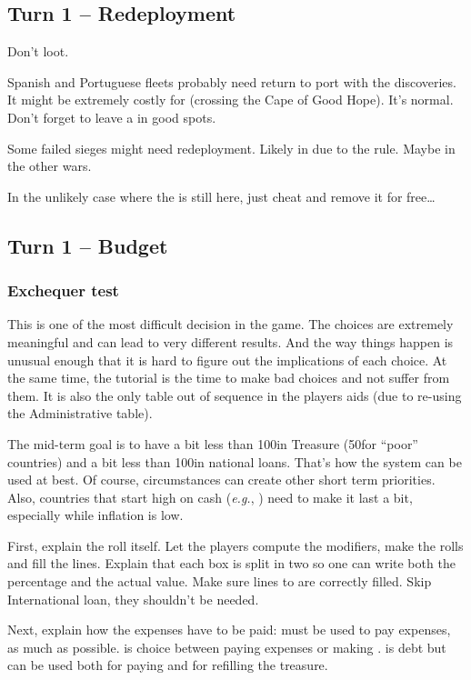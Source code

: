 \subsection{Turn 1 -- Redeployment}
\aparag Don't loot.

\aparag Spanish and Portuguese fleets probably need return to port with the
discoveries. It might be extremely costly for \POR (crossing the Cape of Good
Hope). It's normal. Don't forget to leave a \LeaderC in good spots.

\aparag Some failed sieges might need redeployment. Likely in \villeRagusa due
to the \regionBalkans rule. Maybe in the other wars.

\aparag In the unlikely case where the \REVOLT is still here, just cheat and
remove it for free\ldots

\subsection{Turn 1 -- Budget}
\subsubsection{Exchequer test}
\aparag This is one of the most difficult decision in the game. The choices
are extremely meaningful and can lead to very different results. And the way
things happen is unusual enough that it is hard to figure out the implications
of each choice.
\bparag At the same time, the tutorial is the time to make bad choices and not
suffer from them.
\bparag It is also the only table out of sequence in the players aids (due to
re-using the Administrative table).

\aparag The mid-term goal is to have a bit less than 100\ducats in Treasure
(50\ducats for ``poor'' countries) and a bit less than 100\ducats in national
loans. That's how the system can be used at best.
\bparag Of course, circumstances can create other short term priorities.
\bparag Also, countries that start high on cash (\emph{e.g.}, \POR) need to
make it last a bit, especially while inflation is low.

\aparag First, explain the roll itself. Let the players compute the modifiers,
make the rolls and fill the lines.
\bparag Explain that each box is split in two so one can write both the
percentage and the actual value. Make sure lines 
to  are correctly filled.
\bparag Skip International loan, they shouldn't be needed.

\aparag Next, explain how the expenses have to be paid:
\bparag {} must be used to pay expenses, as much as
possible.
\bparag {} is choice between paying expenses or making
\VPs.
\bparag {} is debt but can be used both for paying and for
refilling the treasure.

